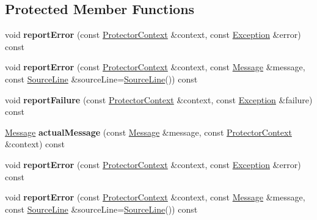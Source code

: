\subsection*{Protected Member Functions}
\begin{DoxyCompactItemize}
\item 
\hypertarget{class_protector_a94c08e57ebcf59ed093916c16384c99a}{void {\bfseries report\+Error} (const \hyperlink{class_protector_context}{Protector\+Context} \&context, const \hyperlink{class_exception}{Exception} \&error) const }\label{class_protector_a94c08e57ebcf59ed093916c16384c99a}

\item 
\hypertarget{class_protector_ab1fda7a5e61e2033e2a7b848aa04690a}{void {\bfseries report\+Error} (const \hyperlink{class_protector_context}{Protector\+Context} \&context, const \hyperlink{class_message}{Message} \&message, const \hyperlink{class_source_line}{Source\+Line} \&source\+Line=\hyperlink{class_source_line}{Source\+Line}()) const }\label{class_protector_ab1fda7a5e61e2033e2a7b848aa04690a}

\item 
\hypertarget{class_protector_ac52d8e2909a5621d2692ec3ce5d4dbc7}{void {\bfseries report\+Failure} (const \hyperlink{class_protector_context}{Protector\+Context} \&context, const \hyperlink{class_exception}{Exception} \&failure) const }\label{class_protector_ac52d8e2909a5621d2692ec3ce5d4dbc7}

\item 
\hypertarget{class_protector_a259356bbf5f03e07f75ac797c9e34737}{\hyperlink{class_message}{Message} {\bfseries actual\+Message} (const \hyperlink{class_message}{Message} \&message, const \hyperlink{class_protector_context}{Protector\+Context} \&context) const }\label{class_protector_a259356bbf5f03e07f75ac797c9e34737}

\item 
\hypertarget{class_protector_a94c08e57ebcf59ed093916c16384c99a}{void {\bfseries report\+Error} (const \hyperlink{class_protector_context}{Protector\+Context} \&context, const \hyperlink{class_exception}{Exception} \&error) const }\label{class_protector_a94c08e57ebcf59ed093916c16384c99a}

\item 
\hypertarget{class_protector_ab1fda7a5e61e2033e2a7b848aa04690a}{void {\bfseries report\+Error} (const \hyperlink{class_protector_context}{Protector\+Context} \&context, const \hyperlink{class_message}{Message} \&message, const \hyperlink{class_source_line}{Source\+Line} \&source\+Line=\hyperlink{class_source_line}{Source\+Line}()) const }\label{class_protector_ab1fda7a5e61e2033e2a7b848aa04690a}


\end{DoxyCompactItemize}
